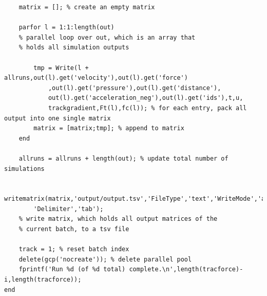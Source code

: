 \begin{lstlisting}
	matrix = []; % create an empty matrix
	
	parfor l = 1:1:length(out) 	
	% parallel loop over out, which is an array that
	% holds all simulation outputs
	
		tmp = Write(l + allruns,out(l).get('velocity'),out(l).get('force')
			,out(l).get('pressure'),out(l).get('distance'),
			out(l).get('acceleration_neg'),out(l).get('ids'),t,u,
			trackgradient,Ft(l),fc(l)); % for each entry, pack all output into one single matrix
		matrix = [matrix;tmp]; % append to matrix
	end
	
	allruns = allruns + length(out); % update total number of simulations

	writematrix(matrix,'output/output.tsv','FileType','text','WriteMode','append',
		'Delimiter','tab'); 
	% write matrix, which holds all output matrices of the 
	% current batch, to a tsv file

	track = 1; % reset batch index 
	delete(gcp('nocreate')); % delete parallel pool
	fprintf('Run %d (of %d total) complete.\n',length(tracforce)-i,length(tracforce));
end
\end{lstlisting}

